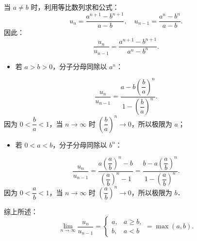 \begin{answer}
当 $a \neq b$ 时，利用等比数列求和公式：
\nopagebreak[4]
\[
u_n = \dfrac{a^{n+1} - b^{n+1}}{a - b}, \quad u_{n-1} = \dfrac{a^n - b^n}{a - b}.
\]
因此：
\nopagebreak[4]
\[
\dfrac{u_n}{u_{n-1}} = \dfrac{a^{n+1} - b^{n+1}}{a^n - b^n}.
\]
\begin{itemize}
\item 若 $a > b > 0$，分子分母同除以 $a^n$：
\end{itemize}
\nopagebreak[4]
\[
\dfrac{u_n}{u_{n-1}} = \dfrac{a - b\left(\dfrac{b}{a}\right)^n}{1 - \left(\dfrac{b}{a}\right)^n}.
\]
  因为 $0 < \dfrac{b}{a} < 1$，当 $n \to \infty$ 时 $\left(\dfrac{b}{a}\right)^n \to 0$，所以极限为 $a$；
\begin{itemize}
\item 若 $0 < a < b$，分子分母同除以 $b^n$：
\end{itemize}
\nopagebreak[4]
\[
\dfrac{u_n}{u_{n-1}} = \dfrac{a\left(\dfrac{a}{b}\right)^n - b}{\left(\dfrac{a}{b}\right)^n - 1} = \dfrac{b - a\left(\dfrac{a}{b}\right)^n}{1 - \left(\dfrac{a}{b}\right)^n}.
\]
  因为 $0 < \dfrac{a}{b} < 1$，当 $n \to \infty$ 时 $\left(\dfrac{a}{b}\right)^n \to 0$，所以极限为 $b$．

综上所述：
\nopagebreak[4]
\[
\lim_{n \to \infty} \dfrac{u_n}{u_{n-1}} = \begin{cases} a, & a \geqslant b, \\ b, & a < b \end{cases} = \max(a, b).
\]



\end{answer}
